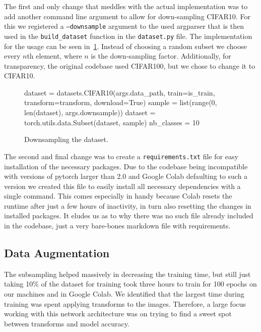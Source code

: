 \documentclass{article}
\begin{document}
The first and only change that meddles with the actual implementation was to add another command line argument to allow for down-sampling CIFAR10.
For this we registered a \texttt{--downsample} argument to the used argparser that is then used in the \verb|build_dataset| function in the \texttt{dataset.py} file.
The implementation for the usage can be seen in~\ref{fig:downsampling}.
Instead of choosing a random subset we choose every $n$th element, where $n$ is the down-sampling factor.
Additionally, for transparency, the original codebase used CIFAR100, but we chose to change it to CIFAR10.
\begin{figure}[h]
    \begin{python}
        dataset = datasets.CIFAR10(args.data_path, train=is_train,
        transform=transform, download=True)
        sample = list(range(0, len(dataset), args.downsample))
        dataset = torch.utils.data.Subset(dataset, sample)
        nb_classes = 10
    \end{python}
    \caption{Downsampling the dataset.}
    \label{fig:downsampling}
\end{figure}

The second and final change was to create a \texttt{requirements.txt} file for easy installation of the necessary packages.
Due to the codebase being incompatible with versions of pytorch larger than 2.0 and Google Colab defaulting to such a version we created this file to easily install all necessary dependencies with a single command.
This comes especially in handy because Colab resets the runtime after just a few hours of inactivity, in turn also resetting the changes in installed packages.
It eludes us as to why there was no such file already included in the codebase, just a very bare-bones markdown file with requirements.

\subsection{Data Augmentation}\label{subsec:data-augmentation}
The subsampling helped massively in decreasing the training time, but still just taking 10\% of the dataset for training took three hours to train for 100 epochs on our machines and in Google Colab.
We identified that the largest time during training was spent applying transforms to the images.
Therefore, a large focus working with this network architecture was on trying to find a sweet spot between transforms and model accuracy.
\end{document}
